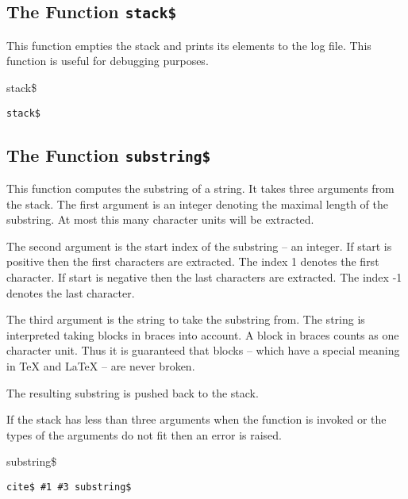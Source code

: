\subsection{The Function \texttt{stack\$}}%

This function empties the stack and prints its elements to the log
file. This function is useful for debugging purposes.

\begin{BstFunction}{stack\$}
\end{BstFunction}

\begin{lstlisting}[language=bst]
  stack$
\end{lstlisting}


\subsection{The Function \texttt{substring\$}}%

This function computes the substring of a string. It takes three
arguments from the stack. The first argument is an integer denoting
the maximal length of the substring. At most this many character units
will be extracted.

The second argument is the start index of the substring -- an integer.
If start is positive then the first characters are extracted.  The
index 1 denotes the first character. If start is negative then the
last characters are extracted.  The index -1 denotes the last
character.

The third argument is the string to take the substring from. The
string is interpreted taking blocks in braces into account. A block in
braces counts as one character unit. Thus it is guaranteed that blocks
-- which have a special meaning in \TeX{} and
\LaTeX{} -- are never broken.

The resulting substring is pushed back to the stack.

If the stack has less than three arguments when the function is
invoked or the types of the arguments do not fit then an error is
raised.

\begin{BstFunction}{substring\$}
\end{BstFunction}

\begin{lstlisting}[language=bst]
  cite$ #1 #3 substring$
\end{lstlisting}

